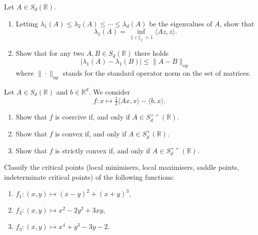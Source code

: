 
\begin{exercise}
Let $A \in S_d(\mathbb{R})$.
\begin{enumerate}
  \item Letting $\lambda_1(A) \leq \lambda_2(A) \leq \cdots \leq \lambda_d(A)$ be the eigenvalues of $A$, show that
  \[
    \lambda_1(A) = \inf_{\|z\|_2=1} \langle Az, z \rangle.
  \]
  \item Show that for any two $A, B \in S_d(\mathbb{R})$ there holds
  \[
    |\lambda_1(A) - \lambda_1(B)| \leq \|A-B\|_{\mathrm{op}}
  \]
  where $\|\cdot\|_{\mathrm{op}}$ stands for the standard operator norm on the set of matrices.
\end{enumerate}
\end{exercise}



\begin{exercise}
Let $A \in S_d(\mathbb{R})$ and $b \in \mathbb{R}^d$. We consider
\[
f : x \mapsto \tfrac{1}{2}\langle Ax, x\rangle - \langle b, x\rangle.
\]
\begin{enumerate}
  \item Show that $f$ is coercive if, and only if $A \in S_{d}^{++}(\mathbb{R})$.
  \item Show that $f$ is convex if, and only if $A \in S_{d}^{+}(\mathbb{R})$.
  \item Show that $f$ is strictly convex if, and only if $A \in S_{d}^{++}(\mathbb{R})$.
\end{enumerate}
\end{exercise}



\begin{exercise}
Classify the critical points (local minimisers, local maximisers, saddle points, indeterminate critical points) of the following functions:
\begin{enumerate}
  \item $f_1 : (x, y) \mapsto (x-y)^2 + (x+y)^3,$
  \item $f_2 : (x, y) \mapsto x^2 - 2y^2 + 3xy,$
  \item $f_3 : (x, y) \mapsto x^4 + y^3 - 3y - 2.$
\end{enumerate}
\end{exercise}

